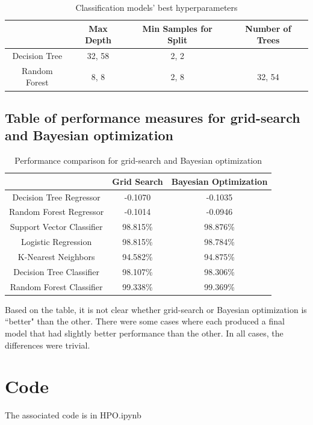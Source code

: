 \documentclass[12pt, letterpaper]{article}
\begin{document}
\begin{table}[H]
\centering
\caption{Classification models' best hyperparameters}
\label{cls_table 3}
\begin{tabular}{c|c|c|c} %
                & Max Depth     & Min Samples for Split     & Number of Trees \\ \hline
Decision Tree   & 32, 58 & 2, 2 \\
Random Forest   & 8, 8 & 2, 8 & 32, 54 \\
\end{tabular}
\end{table}

\subsection{Table of performance measures for grid-search and Bayesian optimization}

\begin{table}[H]
\centering
\caption{Performance comparison for grid-search and Bayesian optimization}
\label{perf_measures}
\begin{tabular}{c|c|c} %
                            & Grid Search     & Bayesian Optimization  \\ \hline
Decision Tree Regressor     & -0.1070 & -0.1035 \\
Random Forest Regressor     & -0.1014 & -0.0946\\
Support Vector Classifier   & 98.815\% & 98.876\%\\
Logistic Regression         & 98.815\% & 98.784\%\\
K-Nearest Neighbors         & 94.582\% & 94.875\%\\
Decision Tree Classifier    & 98.107\% & 98.306\%\\
Random Forest Classifier    & 99.338\% & 99.369\%\\
\end{tabular}
\end{table}

Based on the table, it is not clear whether grid-search or Bayesian optimization is ``better" than the other. There were some cases where each produced a final model that had slightly better performance than the other. In all cases, the differences were trivial.

\section{Code} %

The associated code is in HPO.ipynb
\end{document}
